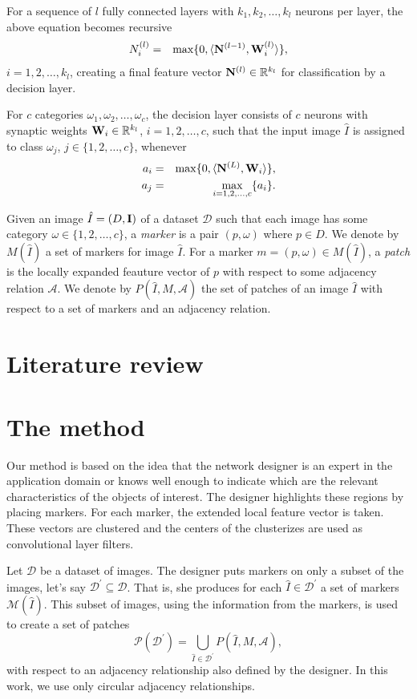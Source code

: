 \documentclass[10pt,twocolumn,letterpaper]{article}
\newcommand{\R}{\mathbb{R}}
\newcommand{\A}{\mathcal{A}}
\newcommand{\D}{\mathcal{D}}
\newcommand{\I}{\hat{I}}
\newcommand{\m}[1]{{\mathrm{\bf #1}}}
\newcommand{\lI}{\m{I}}
\newcommand{\gN}{\m{N}}
\newcommand{\W}{\m{W}}
\newcommand{\M}{\mathcal{M}}
\newcommand{\Pa}{\mathcal{P}}
\newcommand{\pDD}{\D^\prime}
\begin{document}
For a sequence of $l$ fully connected layers with $k_1,  k_2, \ldots, k_l$ neurons per layer, the above equation becomes recursive 
\begin{eqnarray}
  N^{(l)}_i & = & \max\{0,\langle {\gN}^{(l-1)}, {\W}^{(l)}_i\rangle\}, 
\end{eqnarray}
$i=1,2,\ldots,k_l$, creating a final feature vector ${\gN}^{(l)}\in
\R^{k_l}$ for classification by a decision layer.

For $c$ categories $\omega_1, \omega_2, \ldots, \omega_c$, the
decision layer consists of $c$ neurons with synaptic weights ${\W}_i\in \R^{k_l}$, $i=1,2,\ldots,c$, such that the input image
$\I$ is assigned to class $\omega_j$, $j\in \{1,2,\ldots,c\}$,
whenever
\begin{eqnarray}
  a_i & = & \max\{0,\langle {\gN}^{(L)}, {\W}_i\rangle\},\\ 
  a_j & = & \max_{i=1,2,\ldots,c}\{ a_i \}.
\end{eqnarray}

Given an image $\I = (D, \lI)$ of a dataset $\D$ such that each image has some category $\omega \in \{1, 2, \ldots, c\}$, a \textit{marker} is a pair $(p, \omega)$ where $p \in D$. We denote by $M(\I)$ a set of markers for image $\I$. For a marker $m = (p, \omega) \in M(\I)$, a \textit{patch} is the locally expanded feauture vector of $p$ with respect to some adjacency relation $\A$. We denote by $P(\I, M, \A)$ the set of patches of an image $\I$ with respect to a set of markers and an adjacency relation.

\section{Literature review}

\section{The method}
Our method is based on the idea that the network designer is an expert in the application domain or knows well enough to indicate which are the relevant characteristics of the objects of interest. The designer highlights these regions by placing markers. For each marker, the extended local feature vector is taken. These vectors are clustered and the centers of the clusterizes are used as convolutional layer filters.

Let $\D$ be a dataset of images. The designer puts markers on only a subset of the images, let's say $\pDD \subseteq \D$. That is, she produces for each $\I \in \pDD$ a set of markers $\M(\I)$.  This subset of images, using the information from the markers, is used to create a set of patches \[\Pa(\pDD) = \bigcup_{\I \in \pDD}{P(\I, M, \A)},\] with respect to an adjacency relationship also defined by the designer. In this work, we use only circular adjacency relationships.
\end{document}
